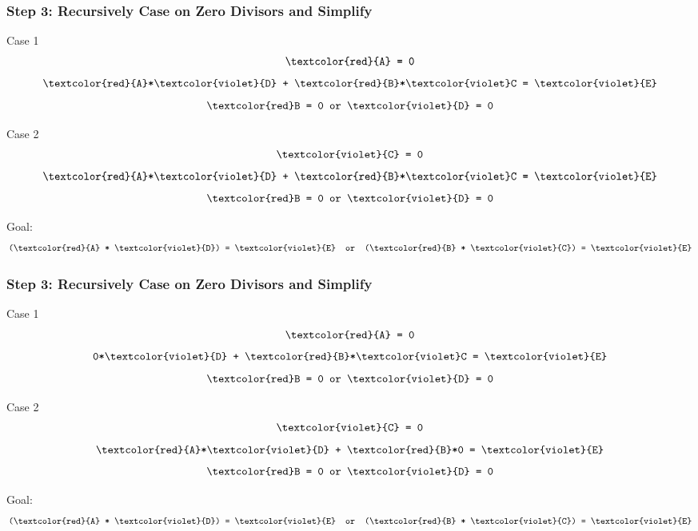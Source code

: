 \documentclass{beamer}
\begin{document}
\begin{frame}
    \frametitle{Step 3: Recursively Case on Zero Divisors and Simplify}

    \parbox[t]{5cm}{
    \centering
    Case 1
        $$ \texttt{\textcolor{red}{A} = 0}$$
        $$ \texttt{\textcolor{red}{A}*\textcolor{violet}{D} + \textcolor{red}{B}*\textcolor{violet}C = \textcolor{violet}{E}} $$
        $$ \texttt{\textcolor{red}B = 0 or \textcolor{violet}{D} = 0}  $$ }%
    \hspace{1cm}%
    \parbox[t]{5cm}{
    \centering
    Case 2
        $$ \texttt{\textcolor{violet}{C} = 0}$$
        $$ \texttt{\textcolor{red}{A}*\textcolor{violet}{D} + \textcolor{red}{B}*\textcolor{violet}C = \textcolor{violet}{E}} $$
        $$ \texttt{\textcolor{red}B = 0 or \textcolor{violet}{D} = 0}  $$ }%


    Goal:
    $$\texttt{(\textcolor{red}{A} * \textcolor{violet}{D}) = \textcolor{violet}{E}  \text{ or } (\textcolor{red}{B} * \textcolor{violet}{C}) = \textcolor{violet}{E}}$$

\end{frame}

\begin{frame}
    \frametitle{Step 3: Recursively Case on Zero Divisors and Simplify}

    \parbox[t]{5cm}{
    \centering
    Case 1
        $$ \texttt{\textcolor{red}{A} = 0}$$
        $$ \texttt{0*\textcolor{violet}{D} + \textcolor{red}{B}*\textcolor{violet}C = \textcolor{violet}{E}} $$
        $$ \texttt{\textcolor{red}B = 0 or \textcolor{violet}{D} = 0}  $$ }%
    \hspace{1cm}%
    \parbox[t]{5cm}{
    \centering
    Case 2
        $$ \texttt{\textcolor{violet}{C} = 0}$$
        $$ \texttt{\textcolor{red}{A}*\textcolor{violet}{D} + \textcolor{red}{B}*0 = \textcolor{violet}{E}} $$
        $$ \texttt{\textcolor{red}B = 0 or \textcolor{violet}{D} = 0}  $$ }%


    Goal:
    $$\texttt{(\textcolor{red}{A} * \textcolor{violet}{D}) = \textcolor{violet}{E}  \text{ or } (\textcolor{red}{B} * \textcolor{violet}{C}) = \textcolor{violet}{E}}$$

\end{frame}
\end{document}
